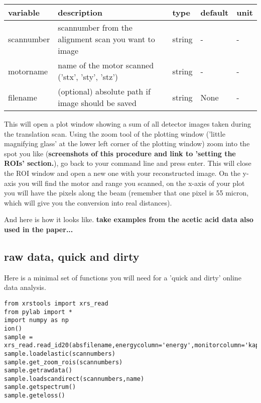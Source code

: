 \documentclass[aps,prl,groupedaddress]{revtex4}
\begin{document}
\begin{ruledtabular}
\begin{tabular}{lllll}
\toprule
variable       & description                                          & type     & default  & unit \\
\hline
scannumber     & scannumber from the alignment scan you want to image & string   & -        & -    \\
motorname      & name of the motor scanned ('stx', 'sty', 'stz')      & string   & -        & -    \\
filename       & (optional) absolute path if image should be saved    & string   & None     & -    \\
\end{tabular}
\end{ruledtabular}

This will open a plot window showing a sum of all detector images taken during the translation scan. Using the zoom tool of the plotting window ('little magnifying glass' at the lower left corner of the plotting window) zoom into the spot you like (\textbf{screenshots of this procedure and link to 'setting the ROIs' section.}), go back to your command line and press enter. This will close the ROI window and open a new one with your reconstructed image. On the y-axis you will find the motor and range you scanned, on the x-axis of your plot you will have the pixels along the beam (remember that one pixel is 55 micron, which will give you the conversion into real distances).

And here is how it looks like. \textbf{take examples from the acetic acid data also used in the paper... }


\subsection{raw data, quick and dirty}
Here is a minimal set of functions you will need for a 'quick and dirty' online data analysis.

\begin{lstlisting}[frame=single]
from xrstools import xrs_read
from pylab import *
import numpy as np
ion()
sample = xrs_read.read_id20(absfilename,energycolumn='energy',monitorcolumn='kap4dio',edfName=None,single_image=True)
sample.loadelastic(scannumbers)
sample.get_zoom_rois(scannumbers)
sample.getrawdata()
sample.loadscandirect(scannumbers,name)
sample.getspectrum()
sample.geteloss()
\end{lstlisting}
\end{document}
